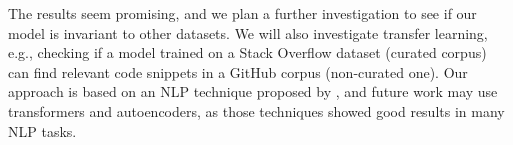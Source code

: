 \documentclass[sigconf]{acmart}
\begin{document}
The results seem promising, and we plan a further investigation to see if our model is invariant to other datasets. We will also investigate transfer learning, e.g., checking if a model trained on a Stack Overflow dataset (curated corpus) can find relevant code snippets in a GitHub corpus (non-curated one). Our approach is based on an NLP technique proposed by \citet{feng-2015}, and future work may use transformers and autoencoders, as those techniques showed good results in many NLP tasks. 




\end{document}
